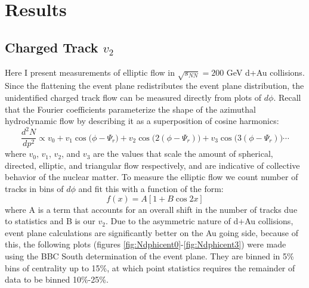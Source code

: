 
\chapter{Results} %
\section{Charged Track $v_{2}$}
Here I present measurements of elliptic flow in $\sqrt{s_{NN}}=200$ GeV d+Au collisions. Since the flattening the event plane redistributes the event plane distribution, the unidentified charged track flow can be measured directly from plots of $d\phi$. Recall that the Fourier coefficients parameterize the shape of the azimuthal hydrodynamic flow by describing it as a superposition of cosine harmonics:
\begin{equation}
\frac{d^{2}N}{dp^{2}} \propto v_0 + v_1 \cos\big(\phi - \Psi_{r}\big) + v_2 \cos\big(2(\phi - \Psi_{r})\big) + v_3 \cos\big(3(\phi - \Psi_{r})\big) \cdots
\end{equation}
where $v_0$, $v_1$, $v_2$, and $v_3$ are the values that scale the amount of spherical, directed, elliptic, and triangular flow respectively, and are indicative of collective behavior of the nuclear matter. To measure the elliptic flow we count number of tracks in bins of $d\phi$ and fit this with a function of the form:
\begin{equation}
\label{v2fitfn}
f(x) = A [1 + B \cos 2x]
\end{equation}
where A is a term that accounts for an overall shift in the number of tracks due to statistics and B is our $v_2$. Due to the asymmetric nature of d+Au collisions, event plane calculations are significantly better on the Au going side, because of this, the following plots (figures \ref{fig:Ndphicent0}-\ref{fig:Ndphicent3}) were made using the BBC South determination of the event plane. They are binned in 5\% bins of centrality up to 15\%, at which point statistics requires the remainder of data to be binned 10\%-25\%. 

